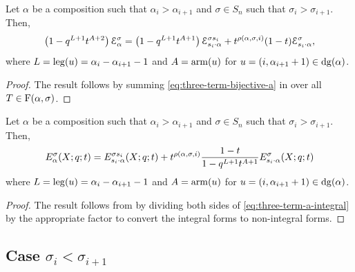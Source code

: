 \begin{corollary} \label{cor:three-term-a}
    Let \(\alpha\) be a composition such that \(\alpha_i > \alpha_{i+1}\) and \(\sigma \in S_n\) such that \(\sigma_i > \sigma_{i+1}\).
    Then,
    \begin{equation} \label{eq:three-term-a-integral}
        \left( 1 - q^{L+1} t^{A + 2} \right) \mathcal{E}_{\alpha}^\sigma
        = 
        \left( 1 - q^{L+1} t^{A + 1} \right) \mathcal{E}_{s_i \cdot \alpha}^{\sigma s_i} 
        +
        t^{\rho(\alpha,\sigma,i)} (1 - t) \mathcal{E}_{s_i \cdot \alpha}^\sigma,
    \end{equation}
    where \(L = \operatorname{leg}(u) = \alpha_i - \alpha_{i+1} - 1\) and \(A = \operatorname{arm}(u)\) for \(u = (i,\alpha_{i+1} +1)\in\dg(\alpha)\).
\end{corollary}

\begin{proof}
    The result follows by summing \eqref{eq:three-term-bijective-a} in  over all \(T \in \Fill(\alpha, \sigma)\).
\end{proof}

\begin{theorem} \label{thm:three-term-a-non-integral}
    Let \(\alpha\) be a composition such that \(\alpha_i > \alpha_{i+1}\) and \(\sigma \in S_n\) such that \(\sigma_i > \sigma_{i+1}\).
    Then,
    \begin{equation} \label{eq:three-term-a-non-integral}
        E_{\alpha}^\sigma(X;q;t)
        =
        E_{s_i \cdot \alpha}^{\sigma s_i}(X;q;t)
        +
        t^{\rho(\alpha,\sigma,i)}\frac{1-t}{1-q^{L+1}t^{A+1}}E_{s_i \cdot \alpha}^\sigma(X;q;t)
    \end{equation}
    where \(L = \operatorname{leg}(u) = \alpha_i - \alpha_{i+1} - 1\) and \(A = \operatorname{arm}(u)\) for \(u = (i,\alpha_{i+1} +1)\in\dg(\alpha)\).
\end{theorem}

\begin{proof}
    The result follows from  by dividing both sides of \eqref{eq:three-term-a-integral} by the appropriate factor to convert the integral forms to non-integral forms.
\end{proof}


\subsection{Case \texorpdfstring{$\sigma_i < \sigma_{i+1}$}{σi < σi+1}}


